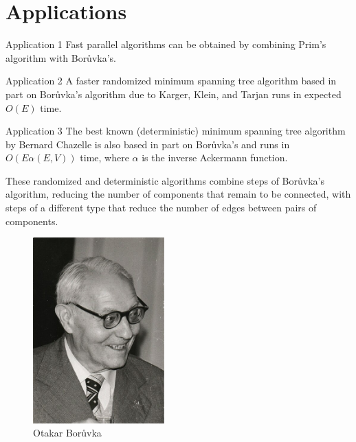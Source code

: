 \documentclass[
	11pt, %
]{beamer}
\begin{document}
\section{Applications}
\begin{frame}
    \tableofcontentscurrent
\end{frame}

\begin{frame}
    \begin{beamerboxesrounded}[shadow=true]{Application 1}
        Fast parallel algorithms can be obtained by combining Prim's algorithm with Borůvka's.
    \end{beamerboxesrounded}

    \begin{beamerboxesrounded}[shadow=true]{Application 2}
        A faster randomized minimum spanning tree algorithm based in part on Borůvka's algorithm due to Karger, 
        Klein, and Tarjan runs in expected $O(E)$ time.
    \end{beamerboxesrounded}

    \begin{beamerboxesrounded}[shadow=true]{Application 3}
        The best known (deterministic) minimum spanning tree algorithm by Bernard Chazelle is also based in part on 
        Borůvka's and runs in $O(E α(E,V))$ time, where $α$ is the inverse Ackermann function.
    \end{beamerboxesrounded}
    
    \begin{fact}
        These randomized and deterministic algorithms combine steps of Borůvka's algorithm, reducing the number of 
        components that remain to be connected, with steps of a different type that reduce the number of edges between 
        pairs of components.
    \end{fact}
\end{frame}

\begin{frame}
    \begin{figure}
        \centering
        \includegraphics[width=0.45\textwidth]{images/Otakar_Boruvka.jpg}
        \caption{Otakar Borůvka}
    \end{figure}
\end{frame}
\end{document}
